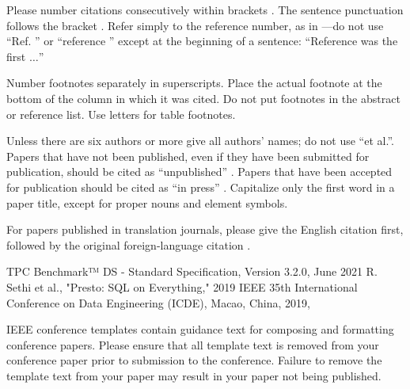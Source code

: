 \documentclass[conference]{IEEEtran}
\begin{document}
Please number citations consecutively within brackets \cite{b1}. The
sentence punctuation follows the bracket \cite{b2}. Refer simply to the reference
number, as in \cite{b3}---do not use ``Ref. \cite{b3}'' or ``reference \cite{b3}'' except at
the beginning of a sentence: ``Reference \cite{b3} was the first $\ldots$''

Number footnotes separately in superscripts. Place the actual footnote at
the bottom of the column in which it was cited. Do not put footnotes in the
abstract or reference list. Use letters for table footnotes.

Unless there are six authors or more give all authors' names; do not use
``et al.''. Papers that have not been published, even if they have been
submitted for publication, should be cited as ``unpublished'' \cite{b4}. Papers
that have been accepted for publication should be cited as ``in press'' \cite{b5}.
Capitalize only the first word in a paper title, except for proper nouns and
element symbols.

For papers published in translation journals, please give the English
citation first, followed by the original foreign-language citation \cite{b6}.

\begin{thebibliography}{00}
     TPC Benchmark™ DS - Standard Specification, Version 3.2.0, June 2021
     R. Sethi et al., "Presto: SQL on Everything," 2019 IEEE 35th International Conference on Data Engineering (ICDE), Macao, China, 2019,
\end{thebibliography}
\vspace{12pt}
\color{red}
IEEE conference templates contain guidance text for composing and formatting conference papers. Please ensure that all template text is removed from your conference paper prior to submission to the conference. Failure to remove the template text from your paper may result in your paper not being published.
\end{document}
